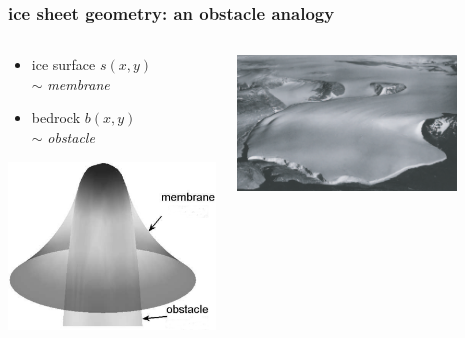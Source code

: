\documentclass{beamer}
\begin{document}
\begin{frame}
  \frametitle{ice sheet geometry: an obstacle analogy}

\begin{columns}
\begin{column}{0.4\textwidth}
\begin{itemize}
\item ice surface $s(x,y)$ \\ $\sim$ \emph{membrane}
\item bedrock $b(x,y)$ \\ $\sim$ \emph{obstacle}
\end{itemize}
\vfill
\begin{center}
\includegraphics[width=1.1\textwidth]{figs/classicalobs}
\end{center}
\end{column}
\begin{column}{0.6\textwidth}
\begin{center}
\includegraphics[width=0.8\textwidth]{polaris} \\


\end{center}
\end{column}
\end{columns}
\end{frame}
\end{document}

